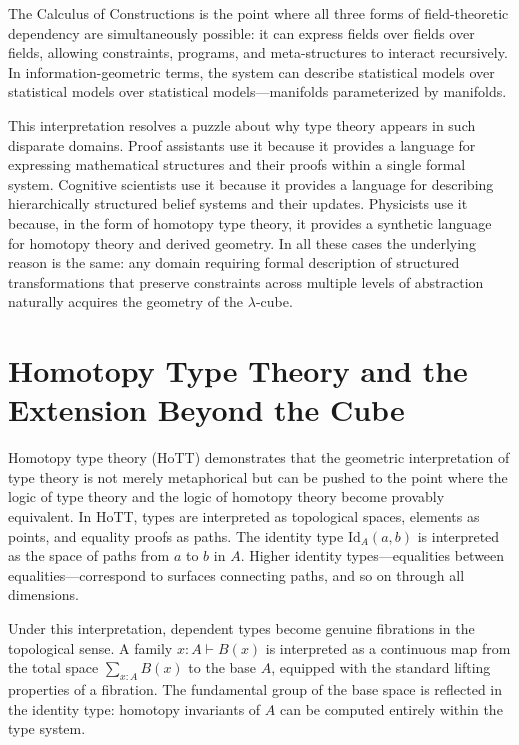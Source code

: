 \documentclass[12pt,a4paper]{article}
\theoremstyle{plain}
\theoremstyle{definition}
\begin{document}
The Calculus of Constructions is the point where all three forms of field-theoretic dependency are simultaneously possible: it can express fields over fields over fields, allowing constraints, programs, and meta-structures to interact recursively. In information-geometric terms, the system can describe statistical models over statistical models over statistical models---manifolds parameterized by manifolds.

This interpretation resolves a puzzle about why type theory appears in such disparate domains. Proof assistants use it because it provides a language for expressing mathematical structures and their proofs within a single formal system. Cognitive scientists use it because it provides a language for describing hierarchically structured belief systems and their updates. Physicists use it because, in the form of homotopy type theory, it provides a synthetic language for homotopy theory and derived geometry. In all these cases the underlying reason is the same: any domain requiring formal description of structured transformations that preserve constraints across multiple levels of abstraction naturally acquires the geometry of the $\lambda$-cube.

\section{Homotopy Type Theory and the Extension Beyond the Cube}

Homotopy type theory (HoTT) demonstrates that the geometric interpretation of type theory is not merely metaphorical but can be pushed to the point where the logic of type theory and the logic of homotopy theory become provably equivalent. In HoTT, types are interpreted as topological spaces, elements as points, and equality proofs as paths. The identity type $\mathrm{Id}_A(a, b)$ is interpreted as the space of paths from $a$ to $b$ in $A$. Higher identity types---equalities between equalities---correspond to surfaces connecting paths, and so on through all dimensions.

Under this interpretation, dependent types become genuine fibrations in the topological sense. A family $x : A \vdash B(x)$ is interpreted as a continuous map from the total space $\sum_{x:A} B(x)$ to the base $A$, equipped with the standard lifting properties of a fibration. The fundamental group of the base space is reflected in the identity type: homotopy invariants of $A$ can be computed entirely within the type system.
\end{document}
